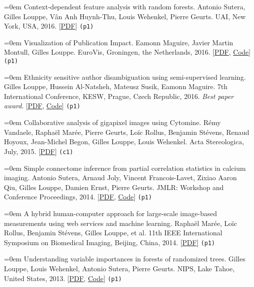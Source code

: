 \documentclass{scrartcl}
\newcommand{\MarginText}[1]{\marginpar{\raggedleft\itshape\small#1}}
\newcommand{\NewPublication}[4]{\noindent\hangindent=0em\hangafter=0 \MarginText{\color{black} #1}{\footnotesize [{\color{Maroon}#2}]} #3 {\footnotesize\color{gray}#4}\vspace{0.5em}}
\begin{document}
\begin{cv}{}
\NewPublication{}{11}{Context-dependent feature analysis with random forests.}{%
Antonio Sutera, Gilles Louppe, V\^an Anh Huynh-Thu, Louis Wehenkel, Pierre Geurts.
UAI, New York, USA, 2016.
[\href{https://arxiv.org/abs/1605.03848}{PDF}]
{\color{black}\tt (p1)}}

\NewPublication{}{10}{Visualization of Publication Impact.}{%
Eamonn Maguire, Javier Martin Montull, Gilles Louppe.
EuroVis, Groningen, the Netherlands, 2016.
[\href{https://arxiv.org/abs/1605.06242}{PDF}, \href{https://github.com/inspirehep/impact-graphs}{Code}]
{\color{black}\tt (p1)}}

\NewPublication{}{9}{Ethnicity sensitive author disambiguation using semi-supervised learning.}{%
Gilles Louppe, Hussein Al-Natsheh, Mateusz Susik, Eamonn Maguire.
7th International Conference, KESW, Prague, Czech Republic, 2016. {\it Best paper award}.
[\href{http://arxiv.org/abs/1508.07744}{PDF}, \href{https://github.com/glouppe/paper-author-disambiguation/}{Code}]
{\color{black}\tt (p1)}}

\NewPublication{}{8}{Collaborative analysis of gigapixel images using Cytomine.}{%
R\'emy Vandaele, Rapha\"el Mar\'ee, Pierre Geurts, Lo\"ic Rollus, Benjamin St\'evens, Renaud Hoyoux, Jean-Michel Begon, Gilles Louppe, Louis Wehenkel.
Acta Stereologica, July, 2015.
[\href{http://popups.ulg.ac.be/0351-580X/index.php?id=3692&file=1&pid=3681}{PDF}]
{\color{black}\tt (c1)}}

\NewPublication{}{7}{Simple connectome inference from partial correlation statistics in calcium imaging.}{%
Antonio Sutera, Arnaud Joly, Vincent Francois-Lavet, Zixiao Aaron Qiu, Gilles Louppe, Damien Ernst, Pierre Geurts.
JMLR: Workshop and Conference Proceedings, 2014.
[\href{http://hdl.handle.net/2268/169767}{PDF}, \href{https://github.com/glouppe/kaggle-connectomics}{Code}]
{\color{black}\tt (p1)}}

\NewPublication{}{6}{A hybrid human-computer approach for large-scale image-based measurements using web services and machine learning.}{%
Rapha\"el Mar{\'e}e, Lo\"ic Rollus, Benjamin St\'evens, Gilles Louppe, et al.
11th IEEE International Symposium on Biomedical Imaging, Beijing, China, 2014.
[\href{http://hdl.handle.net/2268/162084}{PDF}]
{\color{black}\tt (p1)}}

\NewPublication{}{5}{Understanding variable importances in forests of randomized trees.}{%
Gilles Louppe, Louis Wehenkel, Antonio Sutera, Pierre Geurts.
NIPS, Lake Tahoe, United States, 2013.
[\href{http://hdl.handle.net/2268/155642}{PDF}, \href{http://github.com/glouppe/paper-variable-importances}{Code}]
{\color{black}\tt (p1)}}


\end{cv}
\end{document}
